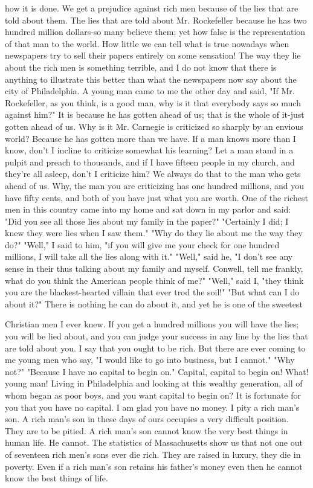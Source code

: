 \documentclass[10pt]{article}
\begin{document}
how it is done. We get a prejudice against rich men because of the lies that are told about them. The lies that are told about Mr. Rockefeller because he has two hundred million dollars-so many believe them; yet how false is the representation of that man to the world. How little we can tell what is true nowadays when newspapers try to sell their papers entirely on some sensation! The way they lie about the rich men is something terrible, and I do not know that there is anything to illustrate this better than what the newspapers now say about the city of Philadelphia. A young man came to me the other day and said, "If Mr. Rockefeller, as you think, is a good man, why is it that everybody says so much against him?" It is because he has gotten ahead of us; that is the whole of it-just gotten ahead of us. Why is it Mr. Carnegie is criticized so sharply by an envious world? Because he has gotten more than we have. If a man knows more than I know, don't I incline to criticize somewhat his learning? Let a man stand in a pulpit and preach to thousands, and if I have fifteen people in my church, and they're all asleep, don't I criticize him? We always do that to the man who gets ahead of us. Why, the man you are criticizing has one hundred millions, and you have fifty cents, and both of you have just what you are worth. One of the richest men in this country came into my home and sat down in my parlor and said: "Did you see all those lies about my family in the paper?" "Certainly I did; I knew they were lies when I saw them." "Why do they lie about me the way they do?" "Well," I said to him, "if you will give me your check for one hundred millions, I will take all the lies along with it." "Well," said he, "I don't see any sense in their thus talking about my family and myself. Conwell, tell me frankly, what do you think the American people think of me?" "Well," said I, "they think you are the blackest-hearted villain that ever trod the soil!" "But what can I do about it?" There is nothing he can do about it, and yet he is one of the sweetest

Christian men I ever knew. If you get a hundred millions you will have the lies; you will be lied about, and you can judge your success in any line by the lies that are told about you. I say that you ought to be rich. But there are ever coming to me young men who say, "I would like to go into business, but I cannot." "Why not?" "Because I have no capital to begin on." Capital, capital to begin on! What! young man! Living in Philadelphia and looking at this wealthy generation, all of whom began as poor boys, and you want capital to begin on? It is fortunate for you that you have no capital. I am glad you have no money. I pity a rich man's son. A rich man's son in these days of ours occupies a very difficult position. They are to be pitied. A rich man's son cannot know the very best things in human life. He cannot. The statistics of Massachusetts show us that not one out of seventeen rich men's sons ever die rich. They are raised in luxury, they die in poverty. Even if a rich man's son retains his father's money even then he cannot know the best things of life.
\end{document}
